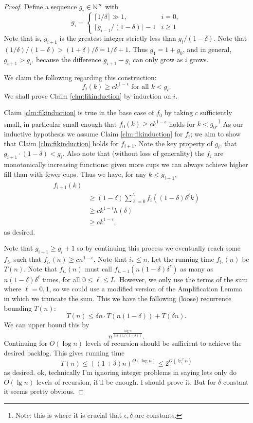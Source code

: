 \documentclass[twocolumn]{article}[10pt]
\begin{document}
\begin{proof}
  Define a sequence $g_i \in \mathbb{N}^\infty$ with 
  $$ g_i = \begin{cases}
    \lceil 1/\delta \rceil \gg 1,  & i = 0,\\
    \lceil g_{i-1}/(1-\delta)\rceil -1 & i  \ge 1
  \end{cases} $$
  Note that is, $g_{i+1}$ is the greatest integer strictly less than $g_i/(1-\delta)$.
  Note that $ (1/\delta) / (1-\delta) > (1+\delta)/\delta = 1/\delta + 1.$
  Thus $g_1 = 1+ g_0$, and in general, $g_{i+1} > g_i$, because the difference
  $g_{i+1}-g_i$ can only grow as $i$ grows.

  We claim the following regarding this construction:
  \begin{equation}
    \label{clm:fikinduction}
    f_i(k) \ge ck^{1-\epsilon} \text{ for all } k < g_i. \tag{*}
  \end{equation}
  We shall prove Claim \ref{clm:fikinduction} by induction on $i$.

  Claim \ref{clm:fikinduction} is true in the base case of $f_0$ by taking $c$
  sufficiently small, in particular small enough that $f_0(k) \ge
  ck^{1-\epsilon}$ holds for $k < g_0$.\footnote{Note: this is where it is
    crucial that $\epsilon, \delta$ are constants.}
  As our inductive hypothesis we assume Claim \ref{clm:fikinduction} for $f_i$;
  we aim to show that Claim \ref{clm:fikinduction} holds for $f_{i+1}$. Note
  the key property of $g_i$, that $g_{i+1}\cdot(1-\delta) < g_i$. Also note
  that (without loss of generality) the $f_i$ are monotonically increasing
  functions: given more cups we can always achieve higher fill than with fewer
  cups. Thus we have, for any $k<g_{i+1}$,
  \begin{align*}
    f_{i+1}(k) &\\
    &\ge (1-\delta)\sum_{\ell=0}^L f_i((1-\delta)\delta^\ell k)\\
    &\ge ck^{1-\epsilon}h(\delta)\\
    &\ge ck^{1-\epsilon},
  \end{align*}
  as desired. 

  Note that $g_{i+1} \ge g_i + 1$ so by continuing this process we eventually
  reach some $f_{i_*}$ such that $f_{i_*}(n) \ge cn^{1-\epsilon}$.
  Note that $i_* \le n$.
  Let the running time $f_{i_*}(n)$ be $T(n)$.
  Note that $f_{i_*}(n)$ must call $f_{i_*-1}(n(1-\delta)\delta^\ell)$ as many
  as $n(1-\delta)\delta^\ell$ times, for all $0 \le \ell\le L$. However, we
  only use the terms of the sum where $\ell=0,1$, so we could use a modified
  version of the Amplification Lemma in which we truncate the sum.
  This we have the following (loose) recurrence bounding $T(n)$:
  $$T(n) \le \delta n \cdot T(n(1-\delta)) + T(\delta n).$$
  We can upper bound this by
  $$n^{\frac{\log n}{\log (1/(1-\delta))}}.$$
  Continuing for $O(\log n)$ levels of recursion should be sufficient to
  achieve the desired backlog. This gives running time
  $$T(n) \le ((1+\delta) n)^{O(\log n)} \le 2^{O(\lg^2 n)}$$
  as desired.
  {\color{red} ok, technically I'm ignoring integer problems in saying lets
  only do $O(\lg n)$ levels of recursion, it'll be enough. I should prove it.
But for $\delta$ constant it seems pretty obvious.}


\end{proof}
\end{document}
